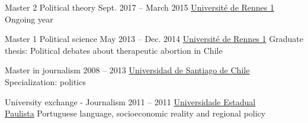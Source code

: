 


%
%




\def\tbflanguage{english}



\begin{coordinatelist}
\end{coordinatelist}










%
%




\begin{yearlist}

\item[Master 2 Political theory]{Sept. 2017 -- March 2015}
     {\href{https://formations.univ-rennes1.fr/formations/master-2-theorie-politique}{Université de Rennes 1}}
     {Ongoing year}
     

 \item[Master 1 Political science]{May 2013 -- Dec. 2014}
     {\href{https://formations.univ-rennes1.fr/formations/master-1-science-politique}{Université de Rennes 1}}
	 {Graduate thesis: Political debates about therapeutic abortion in Chile}


\item[Master in journalism]{2008 -- 2013}
     {\href{http://periodismo.usach.cl/} {Universidad de Santiago de Chile}}
     {Specialization: politics}


\item[University exchange - Journalism]{2011 -- 2011}
     {\href{http://www.unesp.br/} {Universidade Estadual \\ Paulista}}
     {Portuguese language, socioeconomic reality and regional policy}


\end{yearlist}






